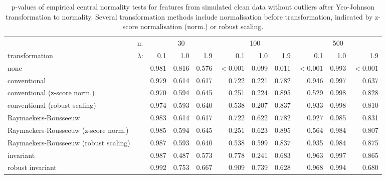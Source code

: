 \documentclass[
  a4paper,
]{article}
\begin{document}
\begin{table}
\begin{center}
\caption{
p-values of empirical central normality tests for features from simulated clean data without outliers after Yeo-Johnson transformation to normality.
Several transformation methods include normalisation before transformation, indicated by z-score normalisation (norm.) or robust scaling.}
\label{tab:clean-transformation-appendix-p-value-yj}
\small{
\begin{tabular}{p{3.5cm} | l r r r r r r r r r}

\toprule
& n: & \multicolumn{3}{c}{30} & \multicolumn{3}{c}{100} & \multicolumn{3}{c}{500} \\
transformation & $\lambda$: & 0.1 & 1.0 & 1.9 & 0.1 & 1.0 & 1.9 & 0.1 & 1.0 & 1.9 \\

\midrule

none                                  & & 0.981 & 0.816 & 0.576 & $<0.001$ & 0.099 & 0.011 & $<0.001$ & 0.993 & $<0.001$ \\
conventional                          & & 0.979 & 0.614 & 0.617 &   0.722  & 0.221 & 0.782 &   0.946  & 0.997 &   0.637 \\
conventional (z-score norm.)          & & 0.970 & 0.594 & 0.645 &   0.251  & 0.224 & 0.895 &   0.529  & 0.998 &   0.828 \\
conventional (robust scaling)         & & 0.974 & 0.593 & 0.640 &   0.538  & 0.207 & 0.837 &   0.933  & 0.998 &   0.810 \\
Raymaekers-Rousseeuw                  & & 0.983 & 0.614 & 0.617 &   0.722  & 0.622 & 0.782 &   0.927  & 0.985 &   0.831 \\
Raymaekers-Rousseeuw (z-score norm.)  & & 0.985 & 0.594 & 0.645 &   0.251  & 0.623 & 0.895 &   0.564  & 0.984 &   0.807 \\
Raymaekers-Rousseeuw (robust scaling) & & 0.987 & 0.593 & 0.640 &   0.538  & 0.599 & 0.837 &   0.935  & 0.984 &   0.875 \\
invariant                             & & 0.987 & 0.487 & 0.573 &   0.778  & 0.241 & 0.683 &   0.963  & 0.997 &   0.865 \\
robust invariant                      & & 0.992 & 0.753 & 0.667 &   0.909  & 0.739 & 0.628 &   0.968  & 0.994 &   0.680 \\

\bottomrule
\end{tabular}
}
\end{center}
\end{table}
\end{document}
